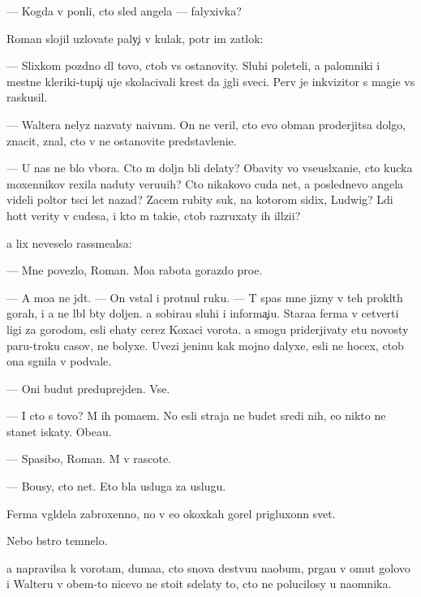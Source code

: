 \documentclass[10pt]{book}
\begin{document}
— Kogda v{\yi} pon{\ia}li, cto sled angela — falyxivka?

Roman slojil uzlovat{\yi}{\y}e paly{\c}i v kulak, pot{\e}r im zat{\yi}lok:

— Slixkom pozdno dl{\ia} tovo, ctob{\yi} vs{\e} ostanovity. Sluhi poleteli, a palomniki i mestn{\yi}{\y}e kleriki-tupi{\c}i uje skolacivali krest da jgli sveci. Perv{\yi}{\y} je inkvizitor s magi{\y}e{\y} vs{\e} raskusil.

— Waltera nelyz{\ia} nazvaty naivn{\yi}m. On ne veril, cto {\y}evo obman proderjitsa dolgo, znacit, znal, cto v{\yi} ne ostanovite predstavleni{\y}e.

— U nas ne b{\yi}lo v{\yi}bora. Cto m{\yi} doljn{\yi} b{\yi}li delaty? Ob{\y}avity vo vse\-usl{\yi}\-xa\-ni\-{\y}e, cto kucka moxennikov rexila naduty veru{\y}u{\x}ih? Cto nikakovo cuda net, a poslednevo angela videli poltor{\yi} t{\yi}s{\ia}ci let nazad? Zacem rubity suk, na kotorom sidix, Ludwig? L{\io}di hot{\ia}t verity v cudesa, i kto m{\yi} taki{\y}e, ctob{\yi} razruxaty ih ill{\io}zi{\y}i?

{\Y}a lix neveselo rassme{\y}alsa:

— Mne povezlo, Roman. Mo{\y}a rabota gorazdo pro{\x}e.

— A mo{\y}a ne jd{\e}t. — On vstal i pro\-t{\ia}\-nul ruku. — T{\yi} spas mne jizny v teh pro\-kl{\ia}\-t{\yi}h gorah, i {\y}a ne l{\io}bl{\io} b{\yi}ty doljen. {\Y}a sobira{\y}u sluhi i informa{\c}i{\y}u. Stara{\y}a ferma v cetverti ligi za gorodom, {\y}esli {\y}ehaty cerez Koxac{\y}i vorota. {\Y}a smogu priderjivaty etu novosty paru-tro{\y}ku casov, ne bolyxe. Uvezi jen{\x}inu kak mojno dalyxe, {\y}esli ne hocex, ctob{\yi} ona sgnila v podvale.

— Oni budut preduprejden{\yi}. Vse.

— I cto s tovo? M{\yi} ih po{\y}ma{\y}em. No {\y}esli straja ne budet sredi nih, {\y}e{\y}o nikto ne stanet iskaty. Obe{\x}a{\y}u.

— Spasibo, Roman. M{\yi} v rascote.

— Bo{\y}usy, cto net. Eto b{\yi}la usluga za uslugu.



Ferma v{\yi}gl{\ia}dela zabroxenno{\y}, no v {\y}e{\y}o okoxkah gorel prigluxonn{\yi}{\y} svet.

Nebo b{\yi}stro temnelo.

{\Y}a napravilsa k vorotam, duma{\y}a, cto snova de{\y}stvu{\y}u naobum, pr{\yi}ga{\y}u v omut go\-lo\-vo{\y} i Walteru v ob{\x}em-to nicevo ne stoit sdelaty to, cto ne polucilosy u na\-{\y}om\-ni\-ka.
\end{document}
